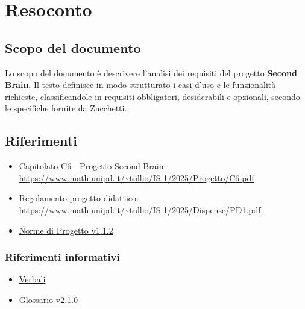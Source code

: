 \section{Resoconto}

\subsection{Scopo del documento}

Lo scopo del documento è descrivere l'analisi dei requisiti 
del progetto \textbf{Second Brain}. Il testo definisce in modo
strutturato i casi d’uso e le funzionalità richieste,
classificandole in requisiti obbligatori, desiderabili
e opzionali, secondo le specifiche fornite da Zucchetti. 


\subsection{Riferimenti}

\begin{itemize}
	\subsubsection{Riferimenti normativi}
        \item Capitolato C6 - Progetto Second Brain: \\  \url{https://www.math.unipd.it/~tullio/IS-1/2025/Progetto/C6.pdf}
        \item Regolamento progetto didattico: \\ \url{https://www.math.unipd.it/~tullio/IS-1/2025/Dispense/PD1.pdf}
        \item \href{https://github.com/Synergo-Unit-UniPD/Documentary-Repo/blob/main/docs/CC/doc_gestionali/doc_interni/norme_di_progetto/norme_di_progetto.pdf}{Norme di Progetto v1.1.2}
    \end{itemize}
    \subsubsection{Riferimenti informativi}
    \begin{itemize}
        \item \href{https://synergo-unit-unipd.github.io/Documentary-Repo/}{Verbali}
        \item \href{https://github.com/Synergo-Unit-UniPD/Documentary-Repo/blob/main/docs/RTB/doc_gestionali/doc_interni/glossario/glossario.pdf}{Glossario v2.1.0}
\end{itemize}

